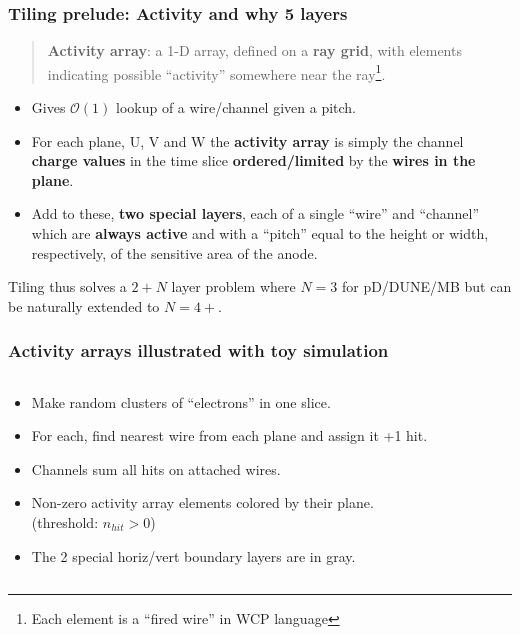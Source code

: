 \documentclass[xcolor=dvipsnames]{beamer}
\begin{document}
\begin{frame}
  \frametitle{Tiling prelude: Activity and why 5 layers}

  \begin{quote}
    \textbf{Activity array}: a 1-D array, defined on a \textbf{ray grid}, with elements indicating possible ``activity'' somewhere near the ray\footnote{Each element is a ``fired wire'' in WCP language}.
  \end{quote}

  \begin{itemize}
  \item Gives $\mathcal{O}(1)$ lookup of a wire/channel given a pitch.
  \item   For each plane, U, V and W the \textbf{activity array} is simply the channel \textbf{charge values} in the time slice \textbf{ordered/limited} by the \textbf{wires in the plane}.

  \item Add to these, \textbf{two special layers}, each of a single ``wire'' and ``channel'' which are \textbf{always active} and with a ``pitch'' equal to the height or width, respectively, of the sensitive area of the anode.

  \end{itemize}

  Tiling  thus solves a $2+N$ layer problem where $N = 3$ for pD/DUNE/MB but can be naturally extended to $N=4+$.

\end{frame}


\begin{frame}
  \frametitle{Activity arrays illustrated with toy simulation}
  \begin{columns}
    \begin{column}{0.35\textwidth}
      \footnotesize
      \begin{itemize}
      \item Make random clusters of ``electrons'' in one slice.
      \item For each, find nearest wire from each plane and assign it +1 hit.
      \item Channels sum all hits on attached wires.
      \item Non-zero activity array elements colored by their plane.\\(threshold: $n_{hit}>0$)
      \item The 2 special horiz/vert boundary layers are in gray.
      \end{itemize}
    \end{column}

    \begin{column}{0.7\textwidth}
      
      \begin{center}
        \tiny
        
      \end{center}
    \end{column}

  \end{columns}
\end{frame}
\end{document}
